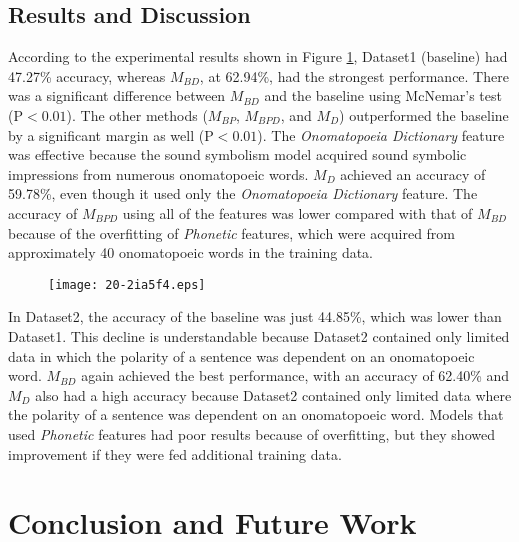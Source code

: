 \documentclass[english]{jnlp_1.4}
\begin{document}
\subsection{Results and Discussion}

According to the experimental results shown in Figure \ref{f:result},
Dataset1 (baseline) had 47.27\% accuracy, whereas $M_\mathit{BD}$, at 62.94\%, had the strongest performance.
There was a significant difference between $M_\mathit{BD}$ and the baseline using McNemar's test ($\mathrm{P} < 0.01$).
The other methods ($M_\mathit{BP}$, $M_\mathit{BPD}$, and $M_{D}$) outperformed the baseline by a significant margin as well ($\mathrm{P} < 0.01$).
The {\it Onomatopoeia Dictionary} feature was effective because the sound symbolism model acquired sound symbolic impressions from numerous onomatopoeic words.
$M_{D}$ achieved an accuracy of 59.78\%, even though it used only the {\it Onomatopoeia Dictionary} feature.
The accuracy of $M_\mathit{BPD}$ using all of the features was lower compared with that of $M_\mathit{BD}$ because of the overfitting of {\it Phonetic} features,
which were acquired from approximately 40 onomatopoeic words in the training data.

\begin{figure}[b]
\begin{center}
\texttt{[image: 20-2ia5f4.eps]}
\end{center}
\label{f:result}
\end{figure}

In Dataset2, the accuracy of the baseline was just 44.85\%, which was lower than Dataset1.
This decline is understandable because Dataset2 contained only limited data in which the polarity of a sentence was dependent on an onomatopoeic word.
$M_\mathit{BD}$ again achieved the best performance, with an accuracy of 62.40\% and
$M_{D}$ also had a high accuracy because Dataset2 contained only limited data where the polarity of a sentence was dependent on an onomatopoeic word.
Models that used {\it Phonetic} features had poor results because of overfitting, but they showed improvement if they were fed additional training data.


\section{Conclusion and Future Work}
\end{document}
